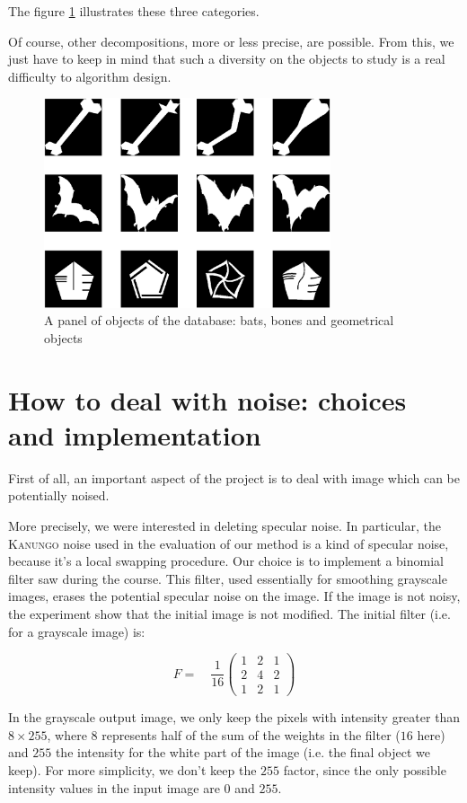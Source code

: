 The figure \ref{shapedata} illustrates these three categories.

Of course, other decompositions, more or less precise, are possible. From this, we just have to keep in mind that such a diversity on the objects to study is a real difficulty to algorithm design.

\begin{figure}[!ht]
    \centering
    \includegraphics[height=175pt]{../database/shapedata.eps}
	\caption{A panel of objects of the database: bats, bones and geometrical objects}
	\label{shapedata}
\end{figure}


\section{How to deal with noise: choices and implementation}

First of all, an important aspect of the project is to deal with image which can be potentially noised.

More precisely, we were interested in deleting specular noise. In particular, the \textsc{Kanungo} noise used in the evaluation of our method is a kind of specular noise, because it's a local swapping procedure. Our choice is to implement a binomial filter saw during the course. This filter, used essentially for smoothing grayscale images, erases the potential specular noise on the image. If the image is not noisy, the experiment show that the initial image is not modified. The initial filter (i.e. for a grayscale image) is:

\setcounter{MaxMatrixCols}{3}
\[ F = \quad \frac{1}{16} \begin{pmatrix}
1 & 2 & 1 \\
2 & 4 & 2 \\
1 & 2 & 1
\end{pmatrix}\]

In the grayscale output image, we only keep the pixels with intensity greater than $8 \times 255$, where $8$ represents half of the sum of the weights in the filter ($16$ here) and $255$ the intensity for the white part of the image (i.e. the final object we keep). For more simplicity, we don't keep the $255$ factor, since the only possible intensity values in the input image are $0$ and $255$.

